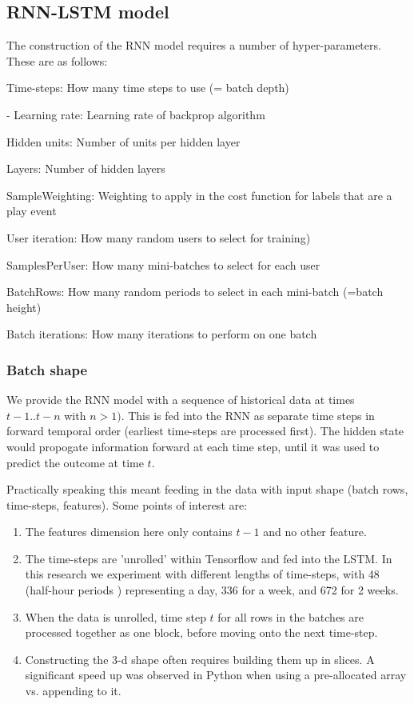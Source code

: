 \subsection{RNN-LSTM model}

The construction of the RNN model requires a number of hyper-parameters. These are as follows:

\begin{list}{-}
\item Time-steps: How many time steps to use (= batch depth)
\item - Learning rate: Learning rate of backprop algorithm
\item Hidden units: Number of units per hidden layer
	\item Layers: Number of hidden layers
	\item SampleWeighting: Weighting to apply in the cost function for labels that are a play event
	\item User iteration: How many random users to select for training)
	\item SamplesPerUser: How many mini-batches to select for each user
	\item BatchRows: How many random periods to select in each mini-batch (=batch height)
	\item Batch iterations: How many iterations to perform on one batch
\end{list}

\subsubsection{Batch shape}

We provide the RNN model with a sequence of historical data at times $t-1 .. t-n$ with $n >1)$. This is fed into the RNN as separate time steps in forward temporal order (earliest time-steps are processed first). The hidden state would propogate information forward at each time step, until it was used to predict the outcome at time $t$.

Practically speaking this meant feeding in the data with input shape (batch rows, time-steps, features). Some points of interest are:

\begin{enumerate}
	\item The features dimension here only contains $t-1$ and no other feature. 
		
	\item The time-steps are 'unrolled' within Tensorflow and fed into the LSTM. In this research we experiment with different lengths of time-steps, with 48 (half-hour periods ) representing a day, 336 for a week, and 672 for 2 weeks.

	\item When the data is unrolled, time step $t$ for all rows in the batches are processed together as one block, before moving onto the next time-step.

	\item Constructing the 3-d shape often requires building them up in slices. A significant speed up was observed in Python when using a pre-allocated array vs. appending to it.
\end{enumerate}

